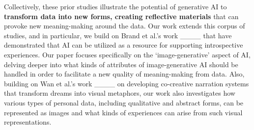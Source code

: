 Collectively, these prior studies illustrate the potential of generative AI to \textbf{transform data into new forms, creating reflective materials} that can provoke new meaning-making around the data. Our work extends this corpus of studies, and in particular, we build on Brand et al.’s work ____ that have demonstrated that AI can be utilized as a resource for supporting introspective experiences. Our paper focuses specifically on the ‘image-generative’ aspect of AI, delving deeper into what kinds of attributes of image-generative AI should be handled in order to facilitate a new quality of meaning-making from data. Also, building on Wan et al.’s work ____ on developing co-creative narration systems that transform dreams into visual metaphors, our work also investigates how various types of personal data, including qualitative and abstract forms, can be represented as images and what kinds of experiences can arise from such visual representations.
